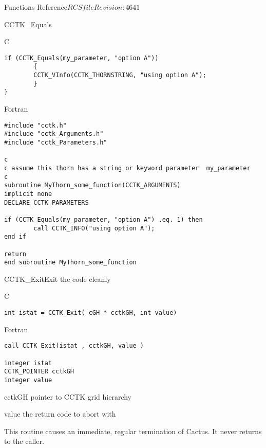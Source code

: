 \begin{cactuspart}{ Functions Reference}{$RCSfile$}{$Revision: 4641 $}
\begin{FunctionDescription}{CCTK\_Equals}
\begin{ExampleSection}
\begin{Example}{C}
\begin{verbatim}
if (CCTK_Equals(my_parameter, "option A"))
        {
        CCTK_VInfo(CCTK_THORNSTRING, "using option A");
        }
}
\end{verbatim}
\end{Example}

\begin{Example}{Fortran}
\begin{verbatim}
#include "cctk.h"
#include "cctk_Arguments.h"
#include "cctk_Parameters.h"

c
c assume this thorn has a string or keyword parameter  my_parameter
c
subroutine MyThorn_some_function(CCTK_ARGUMENTS)
implicit none
DECLARE_CCTK_PARAMETERS

if (CCTK_Equals(my_parameter, "option A") .eq. 1) then
        call CCTK_INFO("using option A");
end if

return
end subroutine MyThorn_some_function
\end{verbatim}
\end{Example}
\end{ExampleSection}
\end{FunctionDescription}

\begin{FunctionDescription}{CCTK\_Exit}{Exit the code cleanly}
\label{CCTK-Exit}
\begin{SynopsisSection}
\begin{Synopsis}{C}
\begin{verbatim}int istat = CCTK_Exit( cGH * cctkGH, int value)\end{verbatim}
\end{Synopsis}
\begin{Synopsis}{Fortran}
\begin{verbatim}call CCTK_Exit(istat , cctkGH, value )

integer istat
CCTK_POINTER cctkGH
integer value \end{verbatim}
\end{Synopsis}
\end{SynopsisSection}
\begin{ParameterSection}
\begin{Parameter}{cctkGH}
pointer to CCTK grid hierarchy
\end{Parameter}
\begin{Parameter}{value}
the return code to abort with
\end{Parameter}
\end{ParameterSection}
\begin{Discussion}
This routine causes an immediate, regular termination of Cactus.
It never returns to the caller.
\end{Discussion}
\end{FunctionDescription}





\end{cactuspart}
